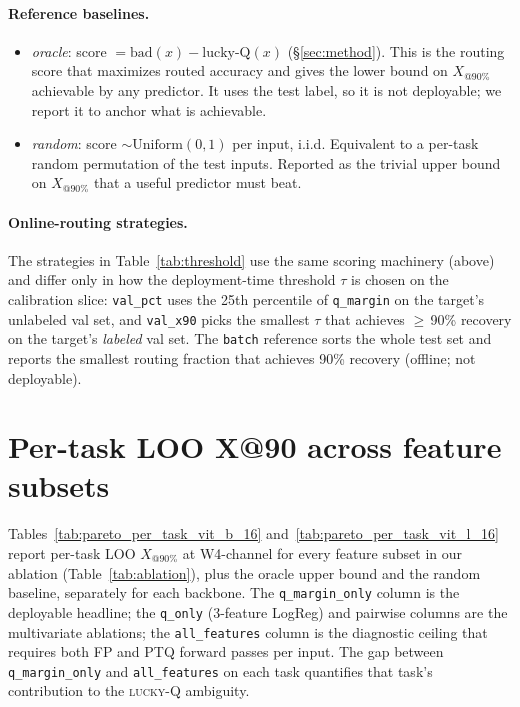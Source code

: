 \documentclass{article}
\makeatletter
\newcommand{\fp}{\textsc{FP}\xspace}
\newcommand{\ptq}{\textsc{PTQ}\xspace}
\newcommand{\luckyq}{\textsc{lucky-Q}\xspace}
\newcommand{\xat}[1]{\ensuremath{X_{@#1\%}}}
\makeatother
\begin{document}
\paragraph{Reference baselines.}
\begin{itemize}[leftmargin=*,topsep=2pt,itemsep=0pt]
\item \emph{oracle}: score $= \text{bad}(x) - \text{lucky-Q}(x)$ (\S\ref{sec:method}). This is the routing score that maximizes routed accuracy and gives the lower bound on \xat{90} achievable by any predictor. It uses the test label, so it is not deployable; we report it to anchor what is achievable.
\item \emph{random}: score $\sim \text{Uniform}(0,1)$ per input, i.i.d. Equivalent to a per-task random permutation of the test inputs. Reported as the trivial upper bound on \xat{90} that a useful predictor must beat.
\end{itemize}

\paragraph{Online-routing strategies.}
The strategies in Table~\ref{tab:threshold} use the same scoring machinery (above) and differ only in how the deployment-time threshold $\tau$ is chosen on the calibration slice: \texttt{val\_pct} uses the 25th percentile of \texttt{q\_margin} on the target's unlabeled val set, and \texttt{val\_x90} picks the smallest $\tau$ that achieves $\geq$\,90\% recovery on the target's \emph{labeled} val set. The \texttt{batch} reference sorts the whole test set and reports the smallest routing fraction that achieves 90\% recovery (offline; not deployable).

\section{Per-task LOO X@90 across feature subsets}\label{app:per-task}

Tables~\ref{tab:pareto_per_task_vit_b_16} and~\ref{tab:pareto_per_task_vit_l_16} report per-task LOO $X_{@90\%}$ at W4-channel for every feature subset in our ablation (Table~\ref{tab:ablation}), plus the oracle upper bound and the random baseline, separately for each backbone. The \texttt{q\_margin\_only} column is the deployable headline; the \texttt{q\_only} (3-feature LogReg) and pairwise columns are the multivariate ablations; the \texttt{all\_features} column is the diagnostic ceiling that requires both \fp{} and \ptq{} forward passes per input. The gap between \texttt{q\_margin\_only} and \texttt{all\_features} on each task quantifies that task's contribution to the \luckyq{} ambiguity.
\end{document}
